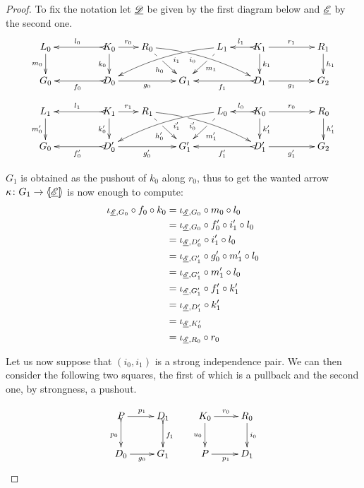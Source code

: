 \begin{proof}
	To fix the notation let $\underline{\mathscr{D}}$ be given by the first diagram below and $\underline{\mathscr{E}}$ by the second one.
	\[\xymatrix@R=20pt@C=20pt{L_0 \ar[d]_{m_0}&& K_0
		\ar[d]_{k_0}\ar@{>->}[ll]_{l_0} \ar[r]^{r_0} & R_0
		\ar@{>}@/^.25cm/[drrr]|(.32)\hole_(.4){i_0}
		\ar[dr]|(.33)\hole_{h_0} && L_1 \ar@{>}@/_.25cm/[dlll]^(.4){i_1}
		\ar[dl]|(.33)\hole^{m_1}& K_1 \ar[d]^{k_1}\ar@{>->}[l]_{l_1}
		\ar[rr]^{r_1} && R_1 \ar[d]^{h_1}\\G_0 && \ar@{>->}[ll]^{f_0}
		D_0 \ar[rr]_{g_0}&& G_1 && \ar@{>->}[ll]^{f_1} D_1
		\ar[rr]_{g_1}&& G_2}
	\]
	\[
	\xymatrix@R=20pt@C=20pt{
		{L_1} \ar[d]_{m_0'}
		&&  {K_1} \ar@{>->}[ll]_{l_1} \ar[r]^{r_1} \ar[d]_{k_0'}
		&  {R_1} \ar[dr]|(.33)\hole_{h_0'}  \ar@/^.25cm/@{>}_(.4){i_0'}|(.32)\hole[drrr]
		& & 
		{L_0}\ar[dl]|(.33)\hole^{m_1'} \ar@/_.25cm/@{>}^(.4){i_1'}[dlll] 
		&  {K_0} \ar@{>->}[l]_{l_0} \ar[rr]^{r_0} \ar[d]^{k_1'}
		& & {R_0} \ar[d]^{h_1'} \\		
		{G_0}
		& & {D_0'} \ar@{>->}[ll]^{f_0'} \ar[rr]_{g_0'}
		& &  {G'_1} 
		& &  {D_1'} \ar@{>->}[ll]^{f_1'} \ar[rr]_{g_1'}
		& & {G_2}  }
	\]
	
 $G_1$ is obtained as the pushout of $k_0$ along $r_0$, thus to get the wanted arrow $\kappa\colon G_1\to \langle \hspace{-1.85pt}[ \underline{\mathscr{E}}]\hspace{-1.85pt}\rangle$ is now enough to compute:
	\begin{align*}
		\iota_{\underline{\mathscr{E}}, G_0}\circ f_{0}\circ  k_{0}&= \iota_{\underline{\mathscr{E}}, G_0}\circ m_{0} \circ l_{ 0}\\&=\iota_{\underline{\mathscr{E}}, G_0}\circ  f'_{0} \circ i'_1 \circ l_0\\&=\iota_{\underline{\mathscr{E}}, D'_0}\circ i'_1 \circ l_0\\&=\iota_{\underline{\mathscr{E}}, G'_1} \circ g'_0\circ m'_1 \circ l_0\\&=\iota_{\underline{\mathscr{E}}, G'_1}\circ m'_1\circ l_0	\\&=\iota_{\underline{\mathscr{E}}, G'_1} \circ f'_1\circ k'_1\\&=\iota_{\underline{\mathscr{E}}, D'_1}\circ k'_1\\&=\iota_{\underline{\mathscr{E}}, K'_0}\\&= \iota_{\underline{\mathscr{E}}, R_0} \circ r_0
	\end{align*}
	
	Let us now suppose that $(i_0,i_1)$ is a strong independence pair. We can then consider the following two squares, the first of which is a pullback and the second one, by strongness, a  pushout.
	
			\[\xymatrix{P \ar[r]^{p_1}  \ar@{>->}[d]_{p_0} & D_1 \ar@{>->}[d]^{f_1} & K_0 \ar[r]^{r_0}  \ar[d]_{u_0} & R_0 \ar[d]^{i_0}\\ D_0\ar[r]_{g_0} & G_1 & P\ar[r]_{p_1} & D_1}\]


\end{proof}

